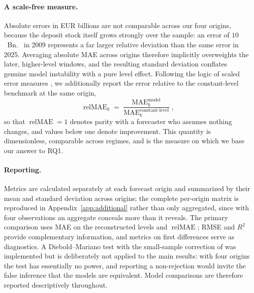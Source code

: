 \documentclass[11pt,a4paper]{article}
\begin{document}
\paragraph{A scale-free measure.}
Absolute errors in EUR billions are not comparable across our four origins,
because the deposit stock itself grows strongly over the sample: an error of
$10$~Bn.~\texteuro{} in 2009 represents a far larger relative deviation than
the same error in 2025. Averaging absolute MAE across origins therefore
implicitly overweights the later, higher-level windows, and the resulting
standard deviation conflates genuine model instability with a pure level
effect. Following the logic of scaled error measures
\citep{hyndman2006mase}, we additionally report the error relative to the
constant-level benchmark at the same origin,
\begin{equation}
    \operatorname{relMAE}_k
    =
    \frac{\operatorname{MAE}_k^{\text{model}}}
         {\operatorname{MAE}_k^{\text{constant-level}}},
    \label{eq:relmae}
\end{equation}
so that $\operatorname{relMAE} = 1$ denotes parity with a forecaster who
assumes nothing changes, and values below one denote improvement. This
quantity is dimensionless, comparable across regimes, and is the measure on
which we base our answer to RQ1.

\paragraph{Reporting.}
Metrics are calculated separately at each forecast origin and summarized by
their mean and standard deviation across origins; the complete per-origin
matrix is reproduced in Appendix~\ref{app:additional} rather than only
aggregated, since with four observations an aggregate conceals more than it
reveals. The primary comparison uses MAE on the reconstructed levels and
$\operatorname{relMAE}$; RMSE and \(R^2\) provide complementary information,
and metrics on first differences serve as diagnostics. A Diebold--Mariano test
\citep{dieboldmariano1995} with the small-sample correction of
\citet{harvey1997} was implemented but is deliberately not applied to the main
results: with four origins the test has essentially no power, and reporting a
non-rejection would invite the false inference that the models are equivalent.
Model comparisons are therefore reported descriptively throughout.

\end{document}
